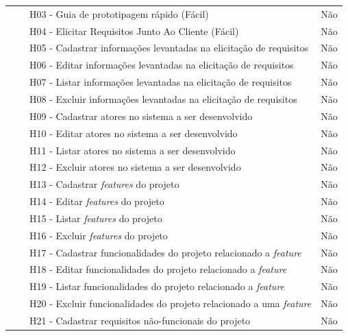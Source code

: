 \begin{longtable}{|M{3.9cm}|M{2.6cm}|M{5.6cm}|M{2.6cm}|}
                                                                    &                      & H03 - Guia de prototipagem rápido (Fácil)                          & Não                  \\  
                                                                    &                      & H04 - Elicitar Requisitos Junto Ao Cliente (Fácil)                 & Não                  \\ 
&  & H05 - Cadastrar informações levantadas na elicitação de requisitos & Não \\                                 
&  & H06 - Editar informações levantadas na elicitação de requisitos & Não \\ 
&  & H07 - Listar informações levantadas na elicitação de requisitos & Não \\ 
&  & H08 - Excluir informações levantadas na elicitação de requisitos & Não \\ 
&  & H09 - Cadastrar atores no sistema a ser desenvolvido & Não \\ 
&  & H10 - Editar atores no sistema a ser desenvolvido & Não \\ 
&  & H11 - Listar atores no sistema a ser desenvolvido & Não \\ 
&  & H12 - Excluir atores no sistema a ser desenvolvido & Não \\ 
&  & H13 - Cadastrar \textit{features} do projeto & Não \\ 
&  & H14 - Editar \textit{features} do projeto & Não \\ 
&  & H15 - Listar \textit{features} do projeto & Não \\ 
&  & H16 - Excluir \textit{features} do projeto & Não \\ 
&  & H17 - Cadastrar funcionalidades do projeto relacionado a \textit{feature} & Não \\ 
&  & H18 - Editar funcionalidades do projeto relacionado a \textit{feature} & Não \\ 
&  & H19 - Listar funcionalidades do projeto relacionado a \textit{feature} & Não \\ 
&  & H20 - Excluir funcionalidades do projeto relacionado a uma \textit{feature} & Não \\ 
&  & H21 - Cadastrar requisitos não-funcionais do projeto & Não \\ 

\end{longtable}
